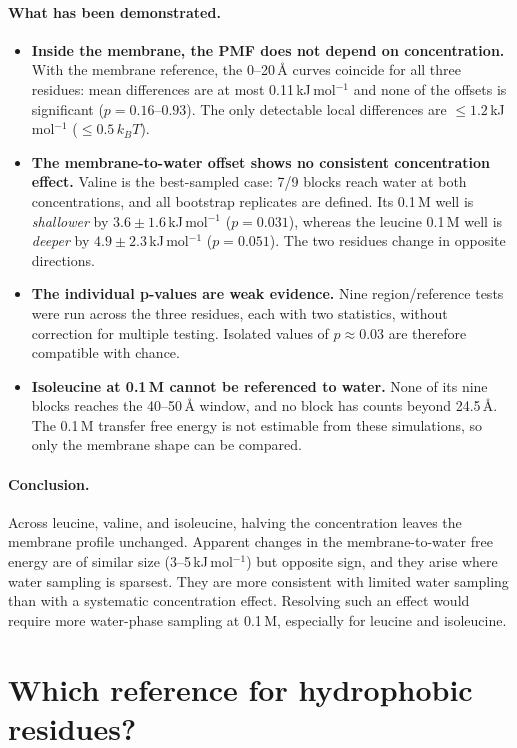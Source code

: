 \documentclass[11pt,a4paper]{article}
\newcommand{\kJ}{\,kJ\,mol$^{-1}$}
\begin{document}
\paragraph{What has been demonstrated.}
\begin{itemize}
  \item \textbf{Inside the membrane, the PMF does not depend on concentration.} With the
  membrane reference, the 0--20\,\AA{} curves coincide for all three residues: mean
  differences are at most 0.11\kJ{} and none of the offsets is significant
  ($p = 0.16$--$0.93$). The only detectable local differences are $\le 1.2$\kJ{}
  ($\le 0.5\,k_BT$).
  \item \textbf{The membrane-to-water offset shows no consistent concentration effect.}
  Valine is the best-sampled case: 7/9 blocks reach water at both concentrations, and all
  bootstrap replicates are defined. Its 0.1\,M well is \emph{shallower} by
  $3.6 \pm 1.6$\kJ{} ($p = 0.031$), whereas the leucine 0.1\,M well is \emph{deeper} by
  $4.9 \pm 2.3$\kJ{} ($p = 0.051$). The two residues change in opposite directions.
  \item \textbf{The individual p-values are weak evidence.} Nine region/reference tests were
  run across the three residues, each with two statistics, without correction for multiple
  testing. Isolated values of $p \approx 0.03$ are therefore compatible with chance.
  \item \textbf{Isoleucine at 0.1\,M cannot be referenced to water.} None of its nine blocks
  reaches the 40--50\,\AA{} window, and no block has counts beyond 24.5\,\AA. The 0.1\,M
  transfer free energy is not estimable from these simulations, so only the membrane shape
  can be compared.
\end{itemize}

\paragraph{Conclusion.} Across leucine, valine, and isoleucine, halving the concentration
leaves the membrane profile unchanged. Apparent changes in the membrane-to-water free energy
are of similar size (3--5\kJ) but opposite sign, and they arise where water sampling is
sparsest. They are more consistent with limited water sampling than with a systematic
concentration effect. Resolving such an effect would require more water-phase sampling at
0.1\,M, especially for leucine and isoleucine.

\section{Which reference for hydrophobic residues?}
\label{sec:reference}
\end{document}

